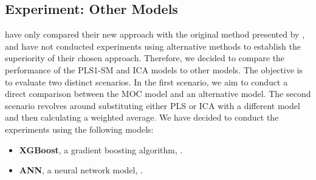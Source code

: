 \subsection{Experiment: Other Models}\label{sec:experiment_other_models}
\citet{cleggRecalibrationMarsScience2017} have only compared their new approach with the original method presented by \citet{wiensPreFlight3}, and have not conducted experiments using alternative methods to establish the superiority of their chosen approach.
Therefore, we decided to compare the performance of the PLS1-SM and ICA models to other models.
The objective is to evaluate two distinct scenarios.
In the first scenario, we aim to conduct a direct comparison between the MOC model and an alternative model. The second scenario revolves around substituting either PLS or ICA with a different model and then calculating a weighted average.
We have decided to conduct the experiments using the following models:

\begin{itemize}
	\item \textbf{XGBoost}, a gradient boosting algorithm, \cite{chen_xgboost_2016}.
	\item \textbf{ANN}, a neural network model, \cite{scikit-learn}.
\end{itemize}

